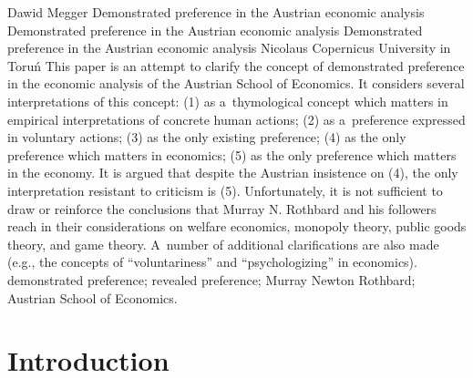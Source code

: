 \begin{artengenv}{Dawid Megger}
	{Demonstrated preference in the Austrian economic analysis}
	{Demonstrated preference in the Austrian economic analysis}
	{Demonstrated preference in the Austrian economic analysis}
	{Nicolaus Copernicus University in Toruń}
	{This paper is an attempt to clarify the concept of demonstrated preference in the economic analysis of the Austrian School of Economics. It considers several interpretations of this concept: (1) as a~thymological concept which matters in empirical interpretations of concrete human actions; (2) as a~preference expressed in voluntary actions; (3) as the only existing preference; (4) as the only preference which matters in economics; (5) as the only preference which matters in the economy. It is argued that despite the Austrian insistence on (4), the only interpretation resistant to criticism is (5). Unfortunately, it is not sufficient to draw or reinforce the conclusions that Murray N. Rothbard and his followers reach in their considerations on welfare economics, monopoly theory, public goods theory, and game theory. A~number of additional clarifications are also made (e.g., the concepts of ``voluntariness'' and ``psychologizing'' in economics).
	}
	{demonstrated preference; revealed preference; Murray Newton Rothbard; Austrian School of Economics.}








\section{Introduction}


\end{artengenv}
